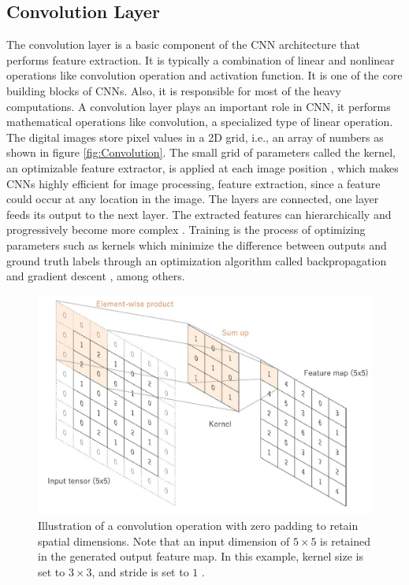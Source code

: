 \subsection{Convolution Layer}
The convolution layer is a basic component of the \ac{CNN} architecture that performs feature extraction. It is typically a combination of linear and nonlinear operations like convolution operation and activation function. It is one of the core building blocks of \acp{CNN}. Also, it is responsible for most of the heavy computations. A convolution layer plays an important role in \ac{CNN}, it performs mathematical operations like convolution, a specialized type of linear operation. The digital images store pixel values in a \ac{2D} grid, i.e., an array of numbers as shown in figure \ref{fig:Convolution}. The small grid of parameters called the kernel, an optimizable feature extractor, is applied at each image position \cite{articleCNNs}, which makes \acp{CNN} highly efficient for image processing, feature extraction, since a feature could occur at any location in the image. The layers are connected, one layer feeds its output to the next layer. The extracted features can hierarchically and progressively become more complex \cite{articleCNNs}. Training is the process of optimizing parameters such as kernels which minimize the difference between outputs and ground truth labels through an optimization algorithm called backpropagation \cite{Goodfellow-et-al-2016} and gradient descent \cite{ruder2017overview}, among others. 



\begin{figure}[H]
        \begin{center}
	    \includegraphics[scale=0.60]{images/Fundamentals/ConvolutionZeroPadding.JPG}
	    \caption[A Convolution Operation With Zero Padding.]{Illustration of a convolution operation with zero padding to retain spatial dimensions. Note that an input dimension of $5 \times 5$ is retained in the generated output feature map. In this example, kernel size is set to $3 \times 3$, and stride is set to $1$ \cite{articleCNNs}.}
	    \label{fig:ConvolutionZeroPadding}
	    \end{center}
\end{figure}


